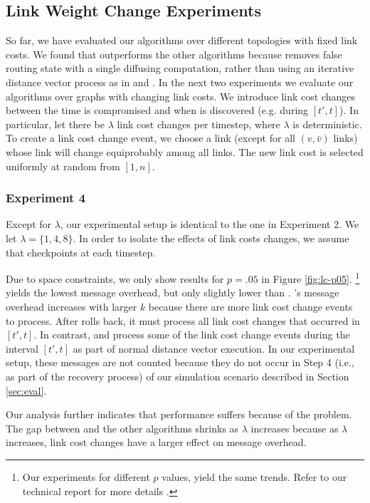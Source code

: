 \subsection{Link Weight Change Experiments}
\label{subsec:change}

So far, we have evaluated our algorithms over different topologies with fixed link costs. We found that \cpr outperforms the other algorithms because \cpr removes false
routing state with a single diffusing computation, rather than using an iterative distance vector process as in \second and \purges.  In the next 
two experiments we evaluate our algorithms over graphs with changing link costs. We introduce link cost changes between the time \bad is compromised and when \bad is discovered 
(e.g. during $[t',t]$). 
In particular, let there be $\lambda$ link cost changes per timestep, where $\lambda$ is deterministic. 
To create a link cost change event, we choose a link (except for all $(v,\bar{v})$ links) whose link will change equiprobably among all links. 
The new link cost is selected uniformly at random from $[1,n]$. 

\subsubsection{Experiment 4}

Except for $\lambda$, our experimental setup is identical to the one in Experiment 2. We let $\lambda = \{1,4,8\}$. In order to isolate the effects of link costs changes,
we assume that \cpr checkpoints at each timestep.

Due to space constraints, we only show results for $p=.05$ in Figure \ref{fig:lc-p05}.  
{\footnote {\small Our experiments for different $p$ values, yield the same trends.  Refer to our technical report for more details \cite{Tech}.}}
\purge yields the lowest message overhead, but only slightly lower than \cprs. 
\cprs's message overhead increases with larger $k$ because there are more link cost change events to process. After \cpr rolls back, it must process all link cost
changes that occurred in $[t',t]$. 
In contrast, \second and \purge process some of the link cost change events during the interval $[t',t]$ as part of normal distance vector execution. 
In our experimental setup, these messages are not counted because 
they do not occur in Step 4 (i.e., as part of the recovery process) of our simulation scenario described in Section \ref{sec:eval}.

Our analysis further indicates that \second performance suffers because of the \infinity problem. %
The gap between \second and the other algorithms shrinks as $\lambda$ increases because as $\lambda$ increases, link cost changes have a larger effect on message overhead.



